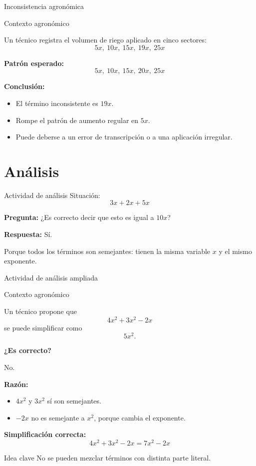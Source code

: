 \documentclass[handout,aspectratio=169,12pt]{beamer}
\newcommand{\IdeaClave}[1]{
	\begin{alertblock}{Idea clave}
		#1
	\end{alertblock}
}
\newcommand{\Agronomia}[1]{
	\begin{exampleblock}{Contexto agronómico}
		#1
	\end{exampleblock}
}
\begin{document}
	\begin{frame}{Inconsistencia agronómica}
		\Agronomia{
			Un técnico registra el volumen de riego aplicado en cinco sectores:
			\[
			5x,\ 10x,\ 15x,\ 19x,\ 25x
			\]
		}
		
		\pause
		\textbf{Patrón esperado:}
		\[
		5x,\ 10x,\ 15x,\ 20x,\ 25x
		\]
		
		\pause
		\textbf{Conclusión:}
		\begin{itemize}
			\item El término inconsistente es \(19x\).
			\pause
			\item Rompe el patrón de aumento regular en \(5x\).
			\pause
			\item Puede deberse a un error de transcripción o a una aplicación irregular.
		\end{itemize}
	\end{frame}
	
	\section{Análisis}
	\begin{frame}{Actividad de análisis}
		Situación:
		\[
		3x+2x+5x
		\]
		
		\pause
		\textbf{Pregunta:} ¿Es correcto decir que esto es igual a \(10x\)?
		
		\pause
		\textbf{Respuesta:} Sí.
		
		\pause
		Porque todos los términos son semejantes: tienen la misma variable \(x\) y el mismo exponente.
	\end{frame}
	
	\begin{frame}{Actividad de análisis ampliada}
		\Agronomia{
			Un técnico propone que
			\[
			4x^2+3x^2-2x
			\]
			se puede simplificar como
			\[
			5x^2.
			\]
		}
		
		\pause
		\textbf{¿Es correcto?}
		
		\pause
		No.
		
		\pause
		\textbf{Razón:}
		\begin{itemize}
			\item \(4x^2\) y \(3x^2\) sí son semejantes.
			\pause
			\item \(-2x\) no es semejante a \(x^2\), porque cambia el exponente.
		\end{itemize}
		
		\pause
		\textbf{Simplificación correcta:}
		\[
		4x^2+3x^2-2x=7x^2-2x
		\]
		
		\pause
		\IdeaClave{No se pueden mezclar términos con distinta parte literal.}
	\end{frame}
	
\end{document}
